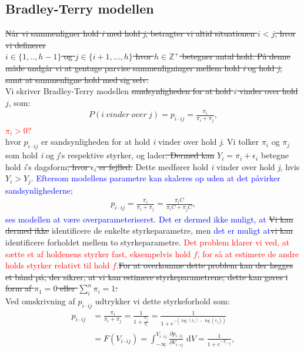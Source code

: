 \documentclass[11pt,a4paper]{article}
\begin{document}
\subsection{Bradley-Terry modellen}
\sout{Når vi sammenligner hold \textit{i} med hold \textit{j}, betragter vi altid situationen $i<j$, hvor vi definerer \\$i \in \{1,..,h-1\}$ og $j\in \{i+1,...,h\}$ hvor $h\in \mathbb{Z}^+$ betegner antal hold. På denne måde undgår vi at gentage parvise sammenligninger mellem hold \textit{i} og hold \textit{j}, samt at sammenligne hold med sig selv.}\\
Vi skriver Bradley-Terry modellen \sout{sandsynligheden for at hold $i$ vinder over hold $j$}, som:
\begin{align*}
    P(i\ vinder\ over\ j) = p_{i\cdot ij} = \frac{\pi_i}{\pi_i+\pi_j},
\end{align*}
\textcolor{red}{$\pi_i>0?$}\\
hvor $p_{i\cdot ij}$ er sandsynligheden for at hold \textit{i} vinder over hold \textit{j}. Vi tolker $\pi_i$ og $\pi_j$ som hold \textit{i} og \textit{j}'s respektive styrker, og lader\sout{. Dermed kan }$Y_i=\pi_i+\epsilon_i$ betegne hold \textit{i}'s dagsform\sout{, hvor $\epsilon_i$ er fejlled.} Dette medfører hold \textit{i} vinder over hold \textit{j}, hvis $Y_i>Y_j$. 
\textcolor{blue}{Eftersom modellens parametre kan skaleres op uden at det påvirker sandsynlighederne;}
\begin{align*}
p_{i\cdot ij} = \frac{\pi_i}{\pi_i+\pi_j} = \frac{\pi_iC}{\pi_iC+\pi_jC},
\end{align*}
\textcolor{blue}{ ses modellen at være overparameteriseret}. \textcolor{blue}{Det er dermed ikke muligt, at} \sout{Vi kan dermed ikke} identificere de enkelte styrkeparametre, men \textcolor{blue}{det er muligt at}\sout{vi kan} identificere forholdet mellem to styrkeparametre. \textcolor{red}{Det problem klarer vi ved, at sætte et af holdenens styrker fast, eksempelvis hold $f$, for så at estimere de andre holds styrker relativt til hold $f$.}\sout{For at overkomme dette problem kan der lægges et bånd på, der sikrer, at vi kan estimere styrkeparametrene; dette kan gøres i form af $\pi_1 = 0$ eller $\sum_i^n \pi_i = 1$. }\\
Ved omskrivning af $p_{i\cdot ij}$ udtrykker vi dette styrkeforhold som:
\begin{align*}
    p_{i\cdot ij} &= \frac{\pi_i}{\pi_i+\pi_j}=\frac{1}{1+\frac{\pi_j}{\pi_i}}=\frac{1}{1+e^{-(\log(\pi_i)-\log(\pi_j))}}\\
    &=F(V_{i\cdot ij})=\int_{-\infty}^{V_{i\cdot ij}} \frac{\partial p_{i\cdot ij}}{\partial V_{i\cdot ij}} \text{ d}V=\frac{1}{1+e^{-V_{i\cdot ij}}},
\end{align*}
\end{document}
